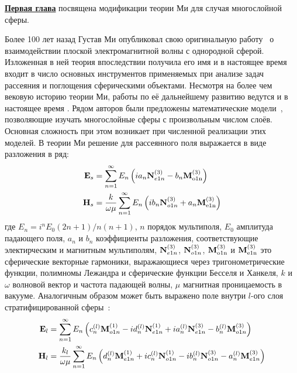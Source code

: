 \underline{\textbf{Первая глава}} посвящена модификации теории Ми для
случая многослойной сферы. 

Более 100 лет назад Густав Ми опубликовал свою оригинальную
работу~\cite{Mie-1908} о взаимодействии плоской электромагнитной волны
с однородной сферой.  Изложенная в ней теория впоследствии получила
его имя и в настоящее время входит в число основных инструментов
применяемых при анализе задач рассеяния и поглощения сферическими
объектами.  Несмотря на более чем вековую историю теории Ми, работы по
её дальнейшему развитию ведутся и в настоящее время%
.  Рядом авторов были предложены математические
модели~\cite{Yang-2003, Pena-scattnlay-2009}, позволяющие изучать
многослойные сферы с произвольным числом слоёв.  Основная сложность
при этом возникает при численной реализации этих моделей.  В теории Ми
решение для рассеянного поля выражается в виде разложения в ряд:
\begin{align*}
{\rm \mathbf{E}}_s &=\sum_{n=1}^{\infty} E_n \left( i a_n {\rm
    \mathbf{N}}_{e1n}^{(3)} - b_n{\rm\mathbf{M}_{o1n}^{(3)}} \right)\\
{\rm \mathbf{H}}_s &=\frac{k}{\omega\mu}
 \sum_{n=1}^{\infty} E_n \left( i b_n {\rm
    \mathbf{N}}_{o1n}^{(3)} + a_n{\rm\mathbf{M}_{e1n}^{(3)}} \right)  
\end{align*}
где $E_n=i^nE_0(2n+1)/n(n+1)$, $n$ порядок мультиполя, $E_0$ амплитуда
падающего поля, $a_n$ и $b_n$ коэффициенты разложения, соответствующие
электирческим и магнитным мультиполям, ${\rm \mathbf{N}}_{e1n}^{(3)}$,
${\rm \mathbf{N}}_{o1n}^{(3)}$, ${\rm\mathbf{M}_{o1n}^{(3)}}$ и
${\rm\mathbf{M}_{e1n}^{(3)}}$ это сферические векторные гармоники,
выражающиеся через тригонометрические функции, полимномы Лежандра и
сферические функции Бесселя и Ханкеля, $k$ и $\omega$ волновой вектор
и частота падающей волны, $\mu$ магнитная проницаемость в вакууме.
Аналогичным образом может быть выражено поле внутри $l$-ого слоя
стратифицированной сферы~\cite{Yang-2003}:
\begin{align}
{\rm \mathbf{E}}_l &=\sum_{n=1}^{\infty} E_n \left(
                     c_n^{(l)}{\rm\mathbf{M}}_{o1n}^{(1)}
                     -i d_n^{(l)} {\rm \mathbf{N}}_{e1n}^{(1)}
                     +i a_n^{(l)} {\rm \mathbf{N}}_{e1n}^{(3)}
                     - b_n^{(l)}{\rm\mathbf{M}}_{o1n}^{(3)} 
                     \right)\label{eq:3p1}\\
{\rm \mathbf{H}}_l &=\frac{k_l}{\omega\mu} \sum_{n=1}^{\infty} E_n
                     \left(
                      d_n^{(l)}{\rm\mathbf{M}}_{e1n}^{(1)} 
                     +i c_n^{(l)} {\rm \mathbf{N}}_{o1n}^{(1)} 
                     -i b_n^{(l)} {\rm \mathbf{N}}_{o1n}^{(3)} 
                     - a_n^{(l)}{\rm\mathbf{M}}_{e1n}^{(3)} 
                     \right)\label{eq:3p2}  
\end{align}
